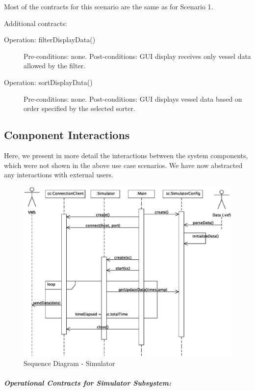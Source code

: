 \documentclass{article}
\begin{document}
Most of the contracts for this scenario are the same as for Scenario 1.

Additional contracts:

\begin{description}
  \item[Operation: filterDisplayData()] Pre-conditions: none.\newline
  Post-conditions: GUI display receives only vessel data allowed by the filter.
  \item[Operation: sortDisplayData()] Pre-conditions: none.\newline
  Post-conditions: GUI displays vessel data based on order specified by the selected sorter.
\end{description}

\subsection{Component Interactions}

Here, we present in more detail the interactions between the system components, which were not shown in the above use case scenarios. We have now abstracted any interactions with external users.

\begin{figure}[!htb]
\caption{Sequence Diagram - Simulator}
\centering
\includegraphics[scale=0.6]{diagrams/simulator-sequence-diagram.eps}
\end{figure}

\subparagraph{Operational Contracts for Simulator Subsystem:}
\end{document}
